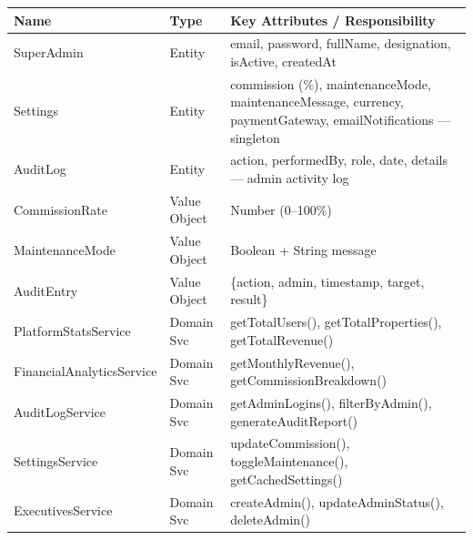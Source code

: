 \documentclass[12pt,a4paper]{article}
\begin{document}
\begin{center}
\begin{tabular}{@{}p{3.5cm}p{2cm}p{8.5cm}@{}}
\toprule
\textbf{Name} & \textbf{Type} & \textbf{Key Attributes / Responsibility} \\
\midrule
SuperAdmin & Entity & email, password, fullName, designation, isActive, createdAt \\
Settings & Entity & commission (\%), maintenanceMode, maintenanceMessage, currency, paymentGateway, emailNotifications — singleton \\
AuditLog & Entity & action, performedBy, role, date, details — admin activity log \\
CommissionRate & Value Object & Number (0--100\%) \\
MaintenanceMode & Value Object & Boolean + String message \\
AuditEntry & Value Object & \{action, admin, timestamp, target, result\} \\
PlatformStatsService & Domain Svc & getTotalUsers(), getTotalProperties(), getTotalRevenue() \\
FinancialAnalyticsService & Domain Svc & getMonthlyRevenue(), getCommissionBreakdown() \\
AuditLogService & Domain Svc & getAdminLogins(), filterByAdmin(), generateAuditReport() \\
SettingsService & Domain Svc & updateCommission(), toggleMaintenance(), getCachedSettings() \\
ExecutivesService & Domain Svc & createAdmin(), updateAdminStatus(), deleteAdmin() \\
\bottomrule
\end{tabular}
\end{center}

\vspace{1em}
\end{document}
